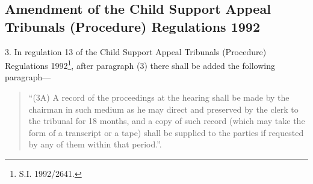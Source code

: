 \documentclass[12pt,a4paper]{article}
\begin{document}
%
%
%
%

\subsection[3. Amendment of the Child Support Appeal Tribunals (Procedure) Regulations 1992]{Amendment of the Child Support Appeal Tribunals (Procedure) Regulations 1992}

3.  In regulation 13 of the Child Support Appeal Tribunals (Procedure) Regulations 1992\footnote{\frenchspacing S.I. 1992/2641.}, after paragraph (3) there shall be added the following paragraph—
\begin{quotation}
“(3A) A record of the proceedings at the hearing shall be made by the chairman in such medium as he may direct and preserved by the clerk to the tribunal for 18 months, and a copy of such record (which may take the form of a transcript or a tape) shall be supplied to the parties if requested by any of them within that period.”.
\end{quotation}
\end{document}
